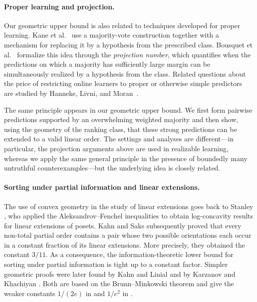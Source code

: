 \documentclass[11pt]{article}
\theoremstyle{definition}
\theoremstyle{remark}
\begin{document}
\paragraph{Proper learning and projection.}
Our geometric upper bound is also related to techniques developed for
proper learning. Kane et al.~\cite{KaneLivniMoranYehudayoff2019} use a
majority-vote construction together with a mechanism for replacing it by a
hypothesis from the prescribed class. Bousquet et al.~\cite{BousquetEtAl2020}
formalize this idea through the \emph{projection number}, which quantifies
when the predictions on which a majority has sufficiently large margin can
be simultaneously realized by a hypothesis from the class. Related questions about the price of restricting
online learners to proper or otherwise simple predictors are studied by
Hanneke, Livni, and Moran~\cite{HannekeLivniMoran2021}.

The same principle appears in our geometric upper bound. We first form
pairwise predictions supported by an overwhelming weighted majority and
then show, using the geometry of the ranking class, that these strong
predictions can be extended to a valid linear order. The settings and analyses are different---in particular, the projection
arguments above are used in realizable learning, whereas we apply the same
general principle in the presence of boundedly many untruthful
counterexamples---but the underlying idea is closely related.


\paragraph{Sorting under partial information and linear extensions.}
The use of convex geometry in the study of linear extensions goes back to
Stanley \cite{Stanley1981}, who applied the Aleksandrov--Fenchel
inequalities to obtain log-concavity results for linear extensions of
posets. Kahn and Saks \cite{KahnSaks1984} subsequently proved that every
non-total partial order contains a pair whose two possible orientations
each occur in a constant fraction of its linear extensions. More precisely,
they obtained the constant $3/11$. As a consequence, the
information-theoretic lower bound for sorting under partial information is
tight up to a constant factor. Simpler geometric proofs were
later found by Kahn and Linial \cite{KahnLinial1991} and by Karzanov and
Khachiyan \cite{KarzanovKhachiyan1991}. Both are based on the Brunn--Minkowski
theorem and give the weaker constants $1/(2e)$ in \cite{KahnLinial1991} and $1/e^2$ in \cite{KarzanovKhachiyan1991}.
\end{document}
